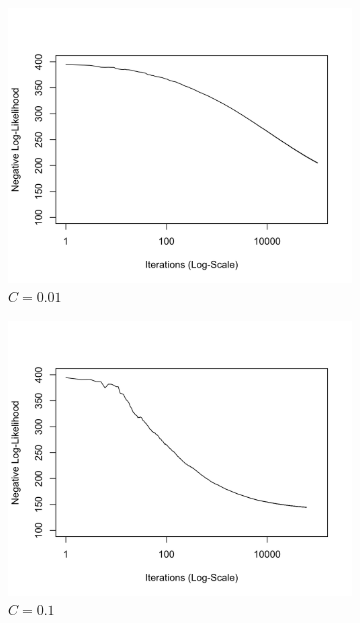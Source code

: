 \documentclass[11 pt]{article}
\begin{document}
\begin{enumerate}[label=(\Alph*)]
	
	\begin{figure}[H]
		\begin{center}
			\begin{subfigure}[h]{0.45\linewidth}
				\includegraphics[width=\linewidth]{Fig/F2PD001.png}
				\caption{$C=0.01$}
			\end{subfigure}
			\begin{subfigure}[h]{0.45\linewidth}
				\includegraphics[width=\linewidth]{Fig/F2PD01.png}
				\caption{$C=0.1$}
			\end{subfigure}
			\begin{subfigure}[h]{0.45\linewidth}

\end{subfigure}
\end{center}
\end{figure}
\end{enumerate}
\end{document}
